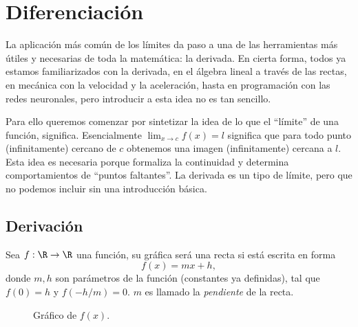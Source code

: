\documentclass[11pt,oneside,a4paper]{book}
\begin{document}
\chapter{Diferenciación}
La aplicación más común de los límites da paso a una de las herramientas más útiles y necesarias de toda la matemática: la derivada. En cierta forma, todos ya estamos familiarizados con la derivada, en el álgebra lineal a través de las rectas, en mecánica con la velocidad y la aceleración, hasta en programación con las redes neuronales, pero introducir a esta idea no es tan sencillo.

Para ello queremos comenzar por sintetizar la idea de lo que el ``límite'' de una función, significa. Esencialmente $\lim_{x\to c}f(x)=l$ significa que para todo punto (infinitamente) cercano de $c$ obtenemos una imagen (infinitamente) cercana a $l$. Esta idea es necesaria porque formaliza la continuidad y determina comportamientos de ``puntos faltantes''. La derivada es un tipo de límite, pero que no podemos incluir sin una introducción básica.

\section{Derivación}
\begin{mydef}
Sea $f:\R\rightarrow\R$ una función, su gráfica será una recta si está escrita en forma
$$f(x)=mx+h,$$
donde $m,h$ son parámetros de la función (constantes ya definidas), tal que $f(0)=h$ y $f(-h/m)=0$. $m$ es llamado la \textit{pendiente} de la recta.
\end{mydef}
\begin{figure}
\centering
{}
\caption{Gráfico de $f(x)$.}
\end{figure}
\end{document}
